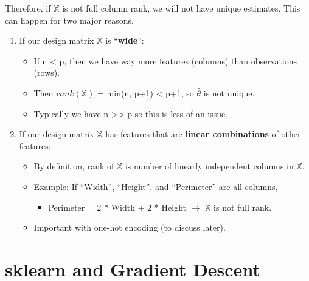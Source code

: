\documentclass[
  letterpaper,
  DIV=11,
  numbers=noendperiod]{scrreprt}
\providecommand{\tightlist}{%
  \setlength{\itemsep}{0pt}\setlength{\parskip}{0pt}}\usepackage{longtable,booktabs,array}
\begin{document}
Therefore, if \(\mathbb{X}\) is not full column rank, we will not have
unique estimates. This can happen for two major reasons.

\begin{enumerate}
\def\labelenumi{\arabic{enumi}.}
\tightlist
\item
  If our design matrix \(\mathbb{X}\) is ``\textbf{wide}'':

  \begin{itemize}
  \tightlist
  \item
    If n \textless{} p, then we have way more features (columns) than
    observations (rows).
  \item
    Then \(rank(\mathbb{X})\) = min(n, p+1) \textless{} p+1, so
    \(\hat{\theta}\) is not unique.
  \item
    Typically we have n \textgreater\textgreater{} p so this is less of
    an issue.
  \end{itemize}
\item
  If our design matrix \(\mathbb{X}\) has features that are
  \textbf{linear combinations} of other features:

  \begin{itemize}
  \tightlist
  \item
    By definition, rank of \(\mathbb{X}\) is number of linearly
    independent columns in \(\mathbb{X}\).
  \item
    Example: If ``Width'', ``Height'', and ``Perimeter'' are all
    columns,

    \begin{itemize}
    \tightlist
    \item
      Perimeter = 2 * Width + 2 * Height \(\rightarrow\) \(\mathbb{X}\)
      is not full rank.
    \end{itemize}
  \item
    Important with one-hot encoding (to discuss later).
  \end{itemize}
\end{enumerate}


\chapter{sklearn and Gradient
Descent}\label{sklearn-and-gradient-descent}
\end{document}
